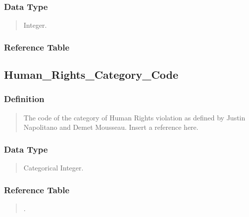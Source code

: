 \documentclass[letterpaper,10pt,english]{sphinxmanual}
\begin{document}
\subsubsection{Data Type}
\label{\detokenize{database_schema:id65}}\begin{quote}

\sphinxAtStartPar
Integer.
\end{quote}


\subsubsection{Reference Table}
\label{\detokenize{database_schema:id66}}\begin{quote}

\sphinxAtStartPar
{\hyperref[\detokenize{database_schema:overview-table}]{}}
\end{quote}


\subsection{Human\_Rights\_Category\_Code}
\label{\detokenize{database_schema:human-rights-category-code}}

\subsubsection{Definition}
\label{\detokenize{database_schema:id67}}\begin{quote}

\sphinxAtStartPar
The code of the category of Human Rights violation as defined by Justin Napolitano and Demet Mousseau. Insert a reference here.
\end{quote}


\subsubsection{Data Type}
\label{\detokenize{database_schema:id68}}\begin{quote}

\sphinxAtStartPar
Categorical Integer.
\end{quote}


\subsubsection{Reference Table}
\label{\detokenize{database_schema:id69}}\begin{quote}

\sphinxAtStartPar
{\hyperref[\detokenize{database_schema:human-rights-category-table}]{}}.
\end{quote}
\end{document}
